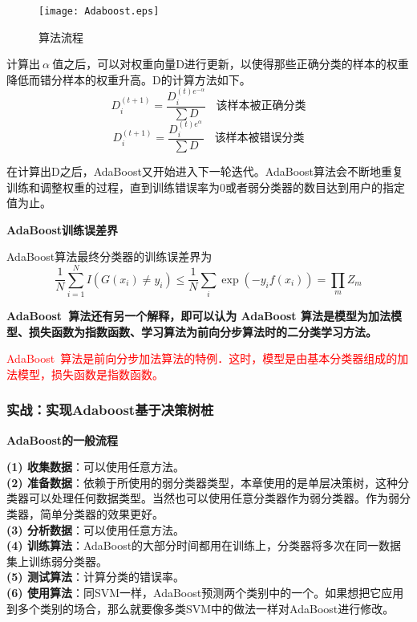 \begin{figure}[!h]
  \centering
  \texttt{[image: Adaboost.eps]}
  \caption{算法流程}
\end{figure}
计算出$~\alpha~$值之后，可以对权重向量D进行更新，以使得那些正确分类的样本的权重降低而错分样本的权重升高。D的计算方法如下。
$$D_i^{(t+1)}=\frac{D_i^{(t)e^{-\alpha}}}{\sum D}~~~~\text{该样本被正确分类} $$
$$D_i^{(t+1)}=\frac{D_i^{(t)e^{\alpha~}}}{\sum D}~~~~\text{该样本被错误分类} $$

在计算出D之后，AdaBoost又开始进入下一轮迭代。AdaBoost算法会不断地重复训练和调整权重的过程，直到训练错误率为0或者弱分类器的数目达到用户的指定值为止。

\textbf{AdaBoost训练误差界}

AdaBoost算法最终分类器的训练误差界为
$$\frac{1}{N}\sum_{i=1}^{N}I(G(x_i)\neq y_i)\leq \frac{1}{N}\sum_{i}\exp(-y_if(x_i))=\prod_mZ_m$$

\textbf{AdaBoost~算法还有另一个解释，即可以认为 AdaBoost 算法是模型为加法模型、损失函数为指数函数、学习算法为前向分步算法时的二分类学习方法。}

\textcolor{red}{AdaBoost~算法是前向分步加法算法的特例．这时，模型是由基本分类器组成的加法模型，损失函数是指数函数。}

\subsubsection{实战：实现Adaboost基于决策树桩}

\noindent\textbf{AdaBoost的一般流程}

\noindent\textbf{(1)	收集数据}：可以使用任意方法。\\
\textbf{(2)	准备数据}：依赖于所使用的弱分类器类型，本章使用的是单层决策树，这种分类器可以处理任何数据类型。当然也可以使用任意分类器作为弱分类器。作为弱分类器，简单分类器的效果更好。\\
\textbf{(3)	分析数据}：可以使用任意方法。\\
\textbf{(4)	训练算法}：AdaBoost的大部分时间都用在训练上，分类器将多次在同一数据集上训练弱分类器。\\
\textbf{(5)	测试算法}：计算分类的错误率。\\
\textbf{(6)	使用算法}：同SVM一样，AdaBoost预测两个类别中的一个。如果想把它应用到多个类别的场合，那么就要像多类SVM中的做法一样对AdaBoost进行修改。\\
~\\
~\\

